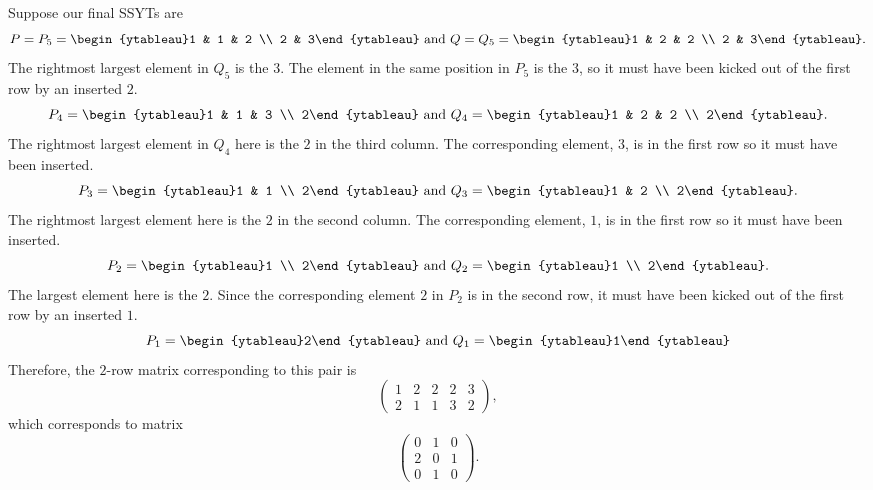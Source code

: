 	\begin{fex}
		Suppose our final SSYTs are
		\[ P = P_5 = \begin{ytableau}1 & 1 & 2 \\ 2 & 3\end{ytableau} \text{ and } Q = Q_5 = \begin{ytableau}1 & 2 & 2 \\ 2 & 3\end{ytableau}. \]
		The rightmost largest element in $Q_5$ is the $3$. The element in the same position in $P_5$ is the $3$, so it must have been kicked out of the first row by an inserted $2$.
		\[ P_4 = \begin{ytableau}1 & 1 & 3 \\ 2\end{ytableau} \text{ and } Q_4 = \begin{ytableau}1 & 2 & 2 \\ 2\end{ytableau}. \]
		The rightmost largest element in $Q_4$ here is the $2$ in the third column. The corresponding element, $3$, is in the first row so it must have been inserted.
		\[ P_3 = \begin{ytableau}1 & 1 \\ 2\end{ytableau} \text{ and } Q_3 = \begin{ytableau}1 & 2 \\ 2\end{ytableau}. \]
		The rightmost largest element here is the $2$ in the second column. The corresponding element, $1$, is in the first row so it must have been inserted.
		\[ P_2 = \begin{ytableau}1 \\ 2\end{ytableau} \text{ and } Q_2 = \begin{ytableau}1 \\ 2\end{ytableau}. \]
		The largest element here is the $2$. Since the corresponding element $2$ in $P_2$ is in the second row, it must have been kicked out of the first row by an inserted $1$.
		\[ P_1 = \begin{ytableau}2\end{ytableau} \text{ and } Q_1 = \begin{ytableau}1\end{ytableau} \]
		Therefore, the $2$-row matrix corresponding to this pair is
		\[
		\begin{pmatrix}
			1 & 2 & 2 & 2 & 3\\
			2 & 1 & 1 & 3 & 2
		\end{pmatrix},
		\]
		which corresponds to matrix
		\[
		\begin{pmatrix}
			0 & 1 & 0 \\
			2 & 0 & 1 \\
			0 & 1 & 0
		\end{pmatrix}.
		\]
	\end{fex}

